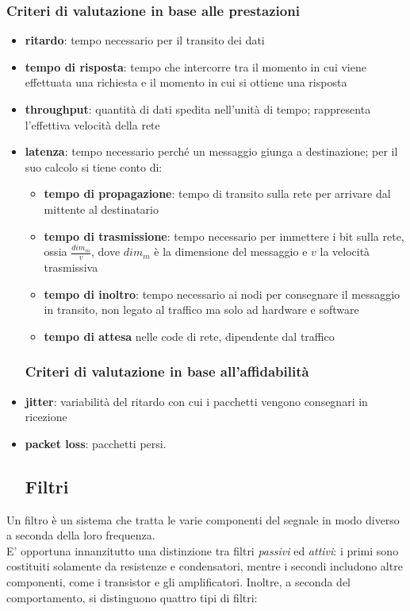 \documentclass[a4paper,11pt]{article}
\def\sub#1{\subsection{#1}\label{#1}}
\def\subsub#1{\subsubsection{#1}\label{#1}}
\begin{document}
\subsub{Criteri di valutazione in base alle prestazioni}
\begin{itemize}
\item \textbf{ritardo}: tempo necessario per il transito dei dati
\item \textbf{tempo di risposta}: tempo che intercorre tra il momento in cui viene effettuata una richiesta e il momento in cui si ottiene una risposta
\item \textbf{throughput}: quantità di dati spedita nell'unità di tempo; rappresenta l'effettiva velocità della rete
\item \textbf{latenza}: tempo necessario perché un messaggio giunga a destinazione; per il suo calcolo si tiene conto di:
\begin{itemize}
\item \textbf{tempo di propagazione}: tempo di transito sulla rete per arrivare dal mittente al destinatario
\item \textbf{tempo di trasmissione}: tempo necessario per immettere i bit sulla rete, ossia $\frac{dim_{m}}{v}$, dove $dim_{m}$ è la dimensione del messaggio e $v$ la velocità trasmissiva
\item \textbf{tempo di inoltro}: tempo necessario ai nodi per consegnare il messaggio in transito, non legato al traffico ma solo ad hardware e software
\item \textbf{tempo di attesa} nelle code di rete, dipendente dal traffico
\end{itemize}
\subsubsection{Criteri di valutazione in base all'affidabilità}
\item \textbf{jitter}: variabilità del ritardo con cui i pacchetti vengono consegnari in ricezione
\item \textbf{packet loss}: pacchetti persi.

\sub{Filtri}
\end{itemize}
Un filtro è un sistema che tratta le varie componenti del segnale in modo diverso a seconda della loro frequenza.
\\E' opportuna innanzitutto una distinzione tra filtri \textit{passivi} ed \textit{attivi}: i primi sono costituiti solamente da resistenze e condensatori, mentre i secondi includono altre componenti, come i transistor e gli amplificatori. Inoltre, a seconda del comportamento, si distinguono quattro tipi di filtri:
\end{document}

